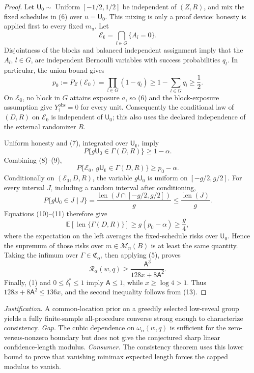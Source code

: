 \documentclass{article}
\begin{document}
\begin{proof}
Let \(\mathsf U_0\sim\operatorname{Uniform}[-1/2,1/2]\) be independent
of \((Z,R)\), and mix the fixed schedules in (6) over \(u=\mathsf U_0\).
This mixing is only a proof device: honesty is applied first to every
fixed \(m_u\).  Let
\[
 \mathcal E_0=\bigcap_{l\in G}\{A_l=0\}.
\]
Disjointness of the blocks and balanced independent assignment imply
that the \(A_l\), \(l\in G\), are independent Bernoulli variables with
success probabilities \(q_l\).  In particular, the union bound gives
\[
 p_0:=P_Z(\mathcal E_0)
 =\prod_{l\in G}(1-q_l)
 \ge1-\sum_{l\in G}q_l
 \ge\frac12.
\tag{8}
\]
On \(\mathcal E_0\), no block in \(G\) attains exposure \(a\), so (6)
and the block-exposure assumption give \(Y_i^{\mathrm{obs}}=0\) for
every unit.  Consequently the conditional law of \((D,R)\) on
\(\mathcal E_0\) is independent of \(\mathsf U_0\); this also uses the
declared independence of the external randomizer \(R\).

Uniform honesty and (7), integrated over \(\mathsf U_0\), imply
\[
 P\{g\mathsf U_0\in\Gamma(D,R)\}\ge1-\alpha.
\tag{9}
\]
Combining (8)--(9),
\[
 P\{\mathcal E_0,\ g\mathsf U_0\in\Gamma(D,R)\}
 \ge p_0-\alpha.
\tag{10}
\]
Conditionally on \((\mathcal E_0,D,R)\), the variable
\(g\mathsf U_0\) is uniform on \([-g/2,g/2]\).  For every interval
\(J\), including a random interval after conditioning,
\[
 P\{g\mathsf U_0\in J\mid J\}
 =\frac{\operatorname{len}(J\cap[-g/2,g/2])}{g}
 \le\frac{\operatorname{len}(J)}{g}.
\tag{11}
\]
Equations (10)--(11) therefore give
\[
 \mathbb E\!\left[\operatorname{len}\{\Gamma(D,R)\}\right]
 \ge g(p_0-\alpha)
 \ge\frac g4,
\tag{12}
\]
where the expectation on the left averages the fixed-schedule risks
over \(\mathsf U_0\).  Hence the supremum of those risks over
\(m\in\mathcal M_n(B)\) is at least the same quantity.  Taking the
infimum over \(\Gamma\in\mathfrak C_\alpha\), then applying (5), proves
\[
 \mathcal R_\alpha(w,q)
 \ge\frac{\mathsf A^3}{128x+8\mathsf A^2}.
\tag{13}
\]
Finally, (1) and \(0\le\delta_l^*\le1\) imply
\(\mathsf A\le1\), while \(x\ge\log4>1\).  Thus
\(128x+8\mathsf A^2\le136x\), and the second inequality follows from
(13).
\end{proof}
\par\smallskip\noindent \textit{Justification.} A common-location prior on a greedily selected low-reveal group yields a fully finite-sample all-procedure converse strong enough to characterize consistency. \textit{Gap.} The cubic dependence on \(\omega_\alpha(w,q)\) is sufficient for the zero-versus-nonzero boundary but does not give the conjectured sharp linear confidence-length modulus. \textit{Consumer.} The consistency theorem uses this lower bound to prove that vanishing minimax expected length forces the capped modulus to vanish.
\end{document}
